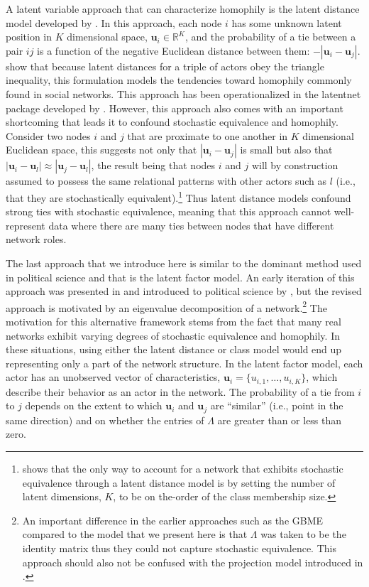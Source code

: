 \documentclass[12pt,pdflatex]{elsarticle}
\newcommand{\pkg}[1]{{\fontseries{b}\selectfont #1}}
\begin{document}
A latent variable approach that can characterize homophily is the latent distance model developed by \citet{hoff:etal:2002}. In this approach, each node $i$ has some unknown latent position in $K$ dimensional space, $\textbf{u}_{i} \in \mathbb{R}^{K}$, and the probability of a tie between a pair $ij$ is a function of the negative Euclidean distance between them: $-|\textbf{u}_{i} - \textbf{u}_{j}|$. \citet{hoff:etal:2002} show that because latent distances for a triple of actors obey the triangle inequality, this formulation models the tendencies toward homophily commonly found in social networks. This approach has been operationalized in the \pkg{latentnet} package developed by \citet{krivitsky:handcock:2015}. However, this approach also comes with an important shortcoming that leads it to confound stochastic equivalence and homophily. Consider two nodes $i$ and $j$ that are proximate to one another in $K$ dimensional Euclidean space, this suggests not only that $|\textbf{u}_{i} - \textbf{u}_{j}|$ is small but also that $|\textbf{u}_{i} - \textbf{u}_{l}| \approx |\textbf{u}_{j} - \textbf{u}_{l}|$, the result being that nodes $i$ and $j$ will by construction assumed to possess the same relational patterns with other actors such as $l$ (i.e., that they are stochastically equivalent).\footnote{\citet{hoff:2008} shows that the only way to account for a network that exhibits stochastic equivalence through a latent distance model is by setting the number of latent dimensions, $K$, to be on the-order of the class membership size.} Thus latent distance models confound strong ties with stochastic equivalence, meaning that this approach cannot well-represent data where there are many ties between nodes that have different network roles. 

The last approach that we introduce here is similar to the dominant method used in political science and that is the latent factor model. An early iteration of this approach was presented in \citet{hoff:2005} and introduced to political science by \citet{hoff:ward:2004}, but the revised approach is motivated by an eigenvalue decomposition of a network.\footnote{An important difference in the earlier approaches such as the GBME compared to the model that we present here is that $\Lambda$ was taken to be the identity matrix thus they could not capture stochastic equivalence. This approach should also not be confused with the projection model introduced in \citet{hoff:etal:2002}.} The motivation for this alternative framework stems from the fact that many real networks exhibit varying degrees of stochastic equivalence and homophily. In these situations, using either the latent distance or class model would end up representing only a part of the network structure. In the latent factor model, each actor has an unobserved vector of characteristics, $\textbf{u}_{i} = \{u_{i,1}, \ldots, u_{i,K} \}$, which describe their behavior as an actor in the network. The probability of a tie from $i$ to $j$ depends on the extent to which $\textbf{u}_{i}$ and $\textbf{u}_{j}$ are ``similar'' (i.e., point in the same direction) and on whether the entries of $\Lambda$ are greater than or less than zero. 
\end{document}
